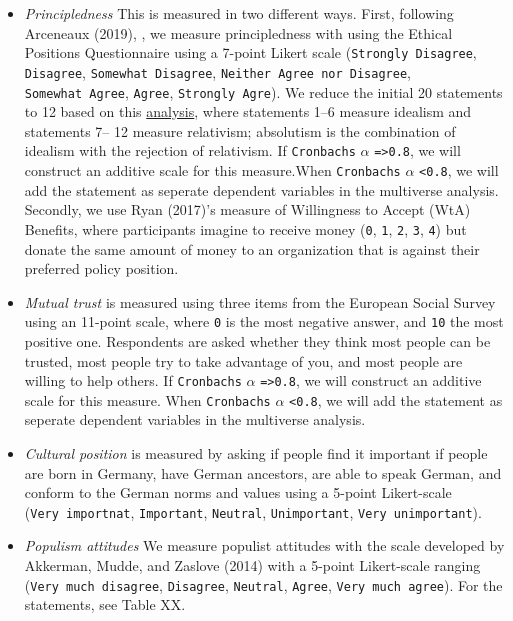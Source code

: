 \documentclass[]{article}
\begin{document}
\begin{itemize}
\item
  \emph{Principledness} This is measured in two different ways. First,
  following Arceneaux (2019), , we measure principledness with using the
  Ethical Positions Questionnaire using a 7-point Likert scale
  (\texttt{Strongly\ Disagree}, \texttt{Disagree},
  \texttt{Somewhat\ Disagree}, \texttt{Neither\ Agree\ nor\ Disagree},
  \texttt{Somewhat\ Agree}, \texttt{Agree}, \texttt{Strongly\ Agre}). We
  reduce the initial 20 statements to 12 based on this
  \href{https://github.com/MarikenvdVelden/willingness-to-accept-compromises/blob/main/docs/pre-analysis-plan/absolutism_irt.pdf}{analysis},
  where statements 1--6 measure idealism and statements 7-- 12 measure
  relativism; absolutism is the combination of idealism with the
  rejection of relativism. If \texttt{Cronbach\textquotesingle{}s}
  \(\alpha\) \texttt{=\textgreater{}0.8}, we will construct an additive
  scale for this measure.When \texttt{Cronbach\textquotesingle{}s}
  \(\alpha\) \texttt{\textless{}0.8}, we will add the statement as
  seperate dependent variables in the multiverse analysis. Secondly, we
  use Ryan (2017)'s measure of Willingness to Accept (WtA) Benefits,
  where participants imagine to receive money (\texteuro \texttt{0},
  \texteuro \texttt{1}, \texteuro \texttt{2}, \texteuro \texttt{3},
  \texteuro \texttt{4}) but donate the same amount of money to an
  organization that is against their preferred policy position.
\item
  \emph{Mutual trust} is measured using three items from the European
  Social Survey using an 11-point scale, where \texttt{0} is the most
  negative answer, and \texttt{10} the most positive one. Respondents
  are asked whether they think most people can be trusted, most people
  try to take advantage of you, and most people are willing to help
  others. If \texttt{Cronbach\textquotesingle{}s} \(\alpha\)
  \texttt{=\textgreater{}0.8}, we will construct an additive scale for
  this measure. When \texttt{Cronbach\textquotesingle{}s} \(\alpha\)
  \texttt{\textless{}0.8}, we will add the statement as seperate
  dependent variables in the multiverse analysis.
\item
  \emph{Cultural position} is measured by asking if people find it
  important if people are born in Germany, have German ancestors, are
  able to speak German, and conform to the German norms and values using
  a 5-point Likert-scale (\texttt{Very\ importnat}, \texttt{Important},
  \texttt{Neutral}, \texttt{Unimportant}, \texttt{Very\ unimportant}).
\item
  \emph{Populism attitudes} We measure populist attitudes with the scale
  developed by Akkerman, Mudde, and Zaslove (2014) with a 5-point
  Likert-scale ranging (\texttt{Very\ much\ disagree},
  \texttt{Disagree}, \texttt{Neutral}, \texttt{Agree},
  \texttt{Very\ much\ agree}). For the statements, see Table XX.
\end{itemize}
\end{document}
